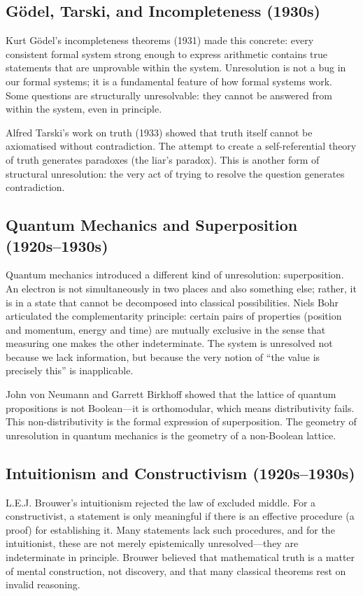 \documentclass[11pt,letterpaper]{article}
\theoremstyle{definition}
\theoremstyle{remark}
\begin{document}
\subsection{Gödel, Tarski, and Incompleteness (1930s)}

Kurt Gödel's incompleteness theorems (1931) made this concrete: every consistent formal system strong enough to express arithmetic contains true statements that are unprovable within the system. Unresolution is not a bug in our formal systems; it is a fundamental feature of how formal systems work. Some questions are structurally unresolvable: they cannot be answered from within the system, even in principle.

Alfred Tarski's work on truth (1933) showed that truth itself cannot be axiomatised without contradiction. The attempt to create a self-referential theory of truth generates paradoxes (the liar's paradox). This is another form of structural unresolution: the very act of trying to resolve the question generates contradiction.

\subsection{Quantum Mechanics and Superposition (1920s--1930s)}

Quantum mechanics introduced a different kind of unresolution: superposition. An electron is not simultaneously in two places and also something else; rather, it is in a state that cannot be decomposed into classical possibilities. Niels Bohr articulated the complementarity principle: certain pairs of properties (position and momentum, energy and time) are mutually exclusive in the sense that measuring one makes the other indeterminate. The system is unresolved not because we lack information, but because the very notion of ``the value is precisely this'' is inapplicable.

John von Neumann and Garrett Birkhoff showed that the lattice of quantum propositions is not Boolean---it is orthomodular, which means distributivity fails. This non-distributivity is the formal expression of superposition. The geometry of unresolution in quantum mechanics is the geometry of a non-Boolean lattice.

\subsection{Intuitionism and Constructivism (1920s--1930s)}

L.E.J. Brouwer's intuitionism rejected the law of excluded middle. For a constructivist, a statement is only meaningful if there is an effective procedure (a proof) for establishing it. Many statements lack such procedures, and for the intuitionist, these are not merely epistemically unresolved---they are indeterminate in principle. Brouwer believed that mathematical truth is a matter of mental construction, not discovery, and that many classical theorems rest on invalid reasoning.
\end{document}
